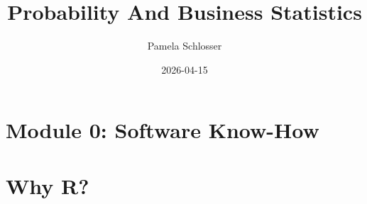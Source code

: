 \documentclass[
  letterpaper,
  DIV=11,
  numbers=noendperiod]{scrreprt}
\title{Probability And Business Statistics}
\author{Pamela Schlosser}
\date{2026-04-15}
\renewcommand*\contentsname{Table of contents}
\newcommand\contentsname{Table of contents}
\begin{document}
\maketitle

\renewcommand*\contentsname{Table of contents}
{
\hypersetup{linkcolor=}
\setcounter{tocdepth}{2}
\tableofcontents
}


\chapter{Module 0: Software Know-How}\label{module-0-software-know-how}


\chapter{Why R?}\label{why-r}
\end{document}
